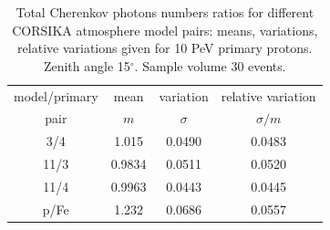 \documentclass[universe,article,submit,moreauthors,pdftex]{Definitions/mdpi}
\begin{document}
\begin{table}[tbh]
\centering
\caption{Total Cherenkov photons numbers ratios for different CORSIKA atmosphere model pairs: means, variations, relative variations given for 10 PeV primary protons. Zenith angle 15$^\circ$. Sample volume 30 events.}
\label{tab:atmmod}
\begin{tabular}{cccc}
    \toprule
    model/primary   & mean &  variation   & relative variation \\ 
         pair       &  $m$ & $\sigma$     & $\sigma/m$ \\ 
    \midrule 
     3/4 &  1.015     &  0.0490     &   0.0483   \\
    11/3 &  0.9834    &  0.0511     &   0.0520   \\
    11/4 &  0.9963    &  0.0443     &   0.0445   \\
    \midrule
     p/Fe &  1.232     &  0.0686     &   0.0557   \\
    \bottomrule
\end{tabular}
\end{table}
\end{document}
